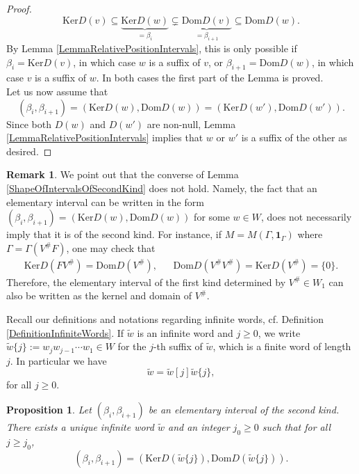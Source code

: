 \documentclass[12pt]{amsart}
\newtheorem{proposition}[theorem]{Proposition}
\theoremstyle{definition}
\newtheorem{remark}[theorem]{Remark}
\renewcommand{\tilde}{\widetilde}
\newcommand{\<}{\langle}   %
\renewcommand{\>}{\rangle} %
\begin{document}
\begin{proof}
    \begin{equation*}
        \mathrm{Ker}D(v) \subseteq  \underbrace{\mathrm{Ker}D(w)}_{= \beta_i} \subsetneq \underbrace{\mathrm{Dom}D(v)}_{= \beta_{i+1}} \subseteq  \mathrm{Dom} D(w).
    \end{equation*}
    By Lemma \ref{LemmaRelativePositionIntervals}, this is only possible if $\beta_i = \mathrm{Ker}D(v)$, in which case $w$ is a suffix of $v$, or $\beta_{i+1} = \mathrm{Dom} D(w)$, in which case $v$ is a suffix of $w$. In both cases the first part of the Lemma is proved.\\
    Let us now assume that 
    \begin{equation*}
        (\beta_i,\beta_{i+1}) = (\mathrm{Ker}D(w), \mathrm{Dom}D(w)) = (\mathrm{Ker}D(w'), \mathrm{Dom}D(w')).
    \end{equation*}
    Since both $D(w)$ and $D(w')$ are non-null, Lemma \ref{LemmaRelativePositionIntervals} implies that $w$ or $w'$ is a suffix of the other as desired.
\end{proof}

\begin{remark}
    We point out that the converse of Lemma \ref{ShapeOfIntervalsOfSecondKind} does not hold. Namely, the fact that an elementary interval can be written in the form $(\beta_i,\beta_{i+1}) = (\mathrm{Ker}D(w), \mathrm{Dom}D(w))$ for some $w\in W$, does not necessarily imply that it is of the second kind. For instance, if $M = M(\Gamma,\mathbf 1_{\Gamma})$ where $\Gamma = \Gamma(V^{\#}F)$, one may check that
    \begin{align*}
        \mathrm{Ker}D(FV^{\#}) = \mathrm{Dom}D(V^{\#}), & & \mathrm{Dom}D(V^{\#}V^{\#}) = \mathrm{Ker}D(V^{\#}) = \{0\}.
    \end{align*}
    Therefore, the elementary interval of the first kind determined by $V^{\#} \in W_1$ can also be written as the kernel and domain of $V^{\#}$.
\end{remark}

Recall our definitions and notations regarding infinite words, cf. Definition \ref{DefinitionInfiniteWords}. If $\tilde w$ is an infinite word and $j\geq 0$, we write $\tilde w\{j\} := w_jw_{j-1}\cdots w_1 \in W$ for the $j$-th suffix of $\tilde w$, which is a finite word of length $j$. In particular we have 
    \begin{equation*}
        \tilde w = \tilde w[j] \tilde w\{j\},
    \end{equation*}
    for all $j\geq 0$.

\begin{proposition}\label{PropositionWordsOfSecondKind}
    Let $(\beta_i,\beta_{i+1})$ be an elementary interval of the second kind. There exists a unique infinite word $\tilde w$ and an integer $j_0 \geq 0$ such that for all $j\geq j_0$, 
    \begin{equation*}
        (\beta_i,\beta_{i+1}) = (\mathrm{Ker} D(\tilde w\{j\}), \mathrm{Dom} D(\tilde w\{j\})).
    \end{equation*}
\end{proposition}
\end{document}
